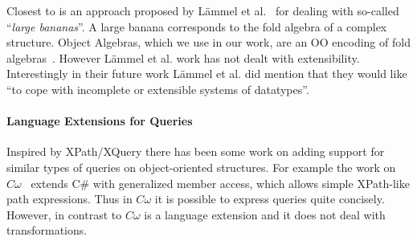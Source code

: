 \begin{comment}
In functional programming there has also been an important line of
work on \emph{datatype-generic programming} (DGP)~\cite{Gibbons07dgp}.  DGP is an
advanced form of \emph{generic programming}~\cite{GP}, where generic
functions are usually defined by inspecting the structure of
types.  Different approaches to DGP in Haskell have been extensively studied and documented~\cite{ComparingGPHaskellRodriquez,ComparingGPHaskellHinze}.
DGP can be used to implement structure-shy traversals as combinators,
similar to the traversals provided by SyB~\cite{hinze2003fun}.
Bringert~\cite{bjorn08acf}
introduced a DGP approach that can also be used to express queries
and transformations.
\end{comment}
Closest to \name is an approach proposed by
L\"ammel et al.~\cite{lammel00dealing} for dealing with so-called
``\emph{large bananas}''. A large banana corresponds to the fold
algebra of a complex structure. Object Algebras, which we use in our
work, are an OO encoding of fold algebras~\cite{Oliveira08visitor,bruno12oa}.
However L\"ammel et al. work has not dealt with extensibility. Interestingly
in their future work  L\"ammel et al. did mention that they would like ``to cope
with incomplete or extensible systems of datatypes''.



\begin{comment}
In that
approach for generalized and basic folds. These fold algebras scale up
applications involving large systems of mutually recursive
datatypes. These works all try to optimize traversal control of large
structures in functional programming paradigm, while our work solves a
similar problem in Object Algebras, a programming style in Object
Oriented Programming paradigm.
\end{comment}

\paragraph{Language Extensions for Queries}
Inspired by XPath/XQuery there has been some work on
adding support for similar types of queries on object-oriented
structures. For example the work on $C\omega$~\cite{BiermanMS05} extends
C\# with generalized member access, which allows simple
XPath-like path expressions. Thus in $C\omega$ it is possible
to express queries quite concisely. However, in contrast to \name
$C\omega$ is a language extension and it does not deal with transformations.

